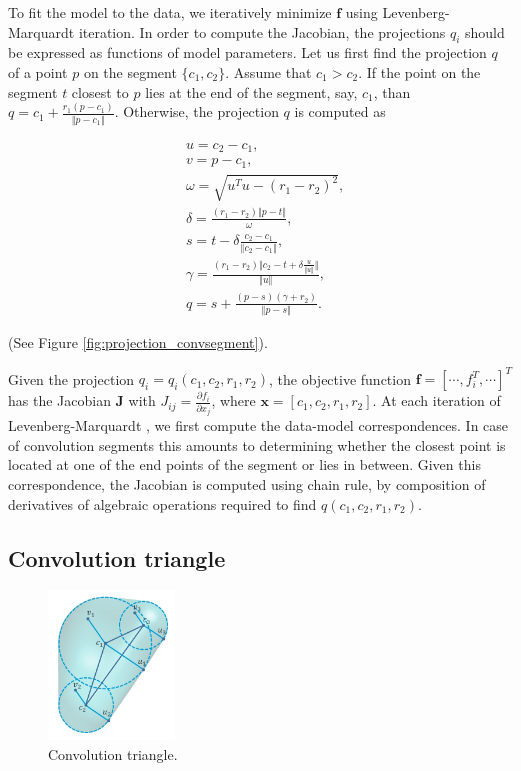 To fit the model to the data, we iteratively minimize $\textbf{f}$ using Levenberg-Marquardt iteration. In order to compute the Jacobian, the projections $q_i$ should be expressed as functions of model parameters. Let us first find the projection $q$ of a point $p$ on the segment $\{c_1, c_2\}$. Assume that $c_1 > c_2$. If the point on the segment $t$ closest to $p$ lies at the end of the segment, say, $c_1$, than $q = c_1 + \frac{r_1  (p - c_1)}{\Vert p - c_1 \Vert}$. 
Otherwise, the projection $q$ is computed as 

\begin{align*}
& u = c_2 - c_1, \\
& v = p - c_1, \\
& \omega = \sqrt{u^T u - (r_1 - r_2)^2}, \\
&  \delta =  \frac{(r_1 - r_2) \Vert p - t \Vert}{\omega}, \\
&   s = t - \delta  \frac{c_2 - c_1} {\Vert c_2 - c_1 \Vert}, \\
&  \gamma = \frac{(r_1 - r_2)   {\Vert c_2 - t + \delta  \frac{u} {\Vert u \Vert}} \Vert} {\Vert u \Vert}, \\
&   q = s +\frac{ (p - s) (\gamma + r_2) }{ \Vert p - s \Vert } .
\end{align*}

(See Figure \ref{fig:projection_convsegment}).

Given the projection $q_i = q_i(c_1, c_2, r_1, r_2)$, the objective function $\textbf{f} = [\cdots, f_i^T, \cdots]^T$  has the Jacobian $\textbf{J}$ with $J_{ij} = \frac{\partial{f_i}}{\partial{x_j}}$, where $\textbf{x} = [c_1, c_2, r_1, r_2]$.  At each iteration of Levenberg-Marquardt , we first compute the data-model correspondences. In case of convolution segments this amounts to determining whether the closest point is located at one of the end points of the segment or lies in between. Given this correspondence, the Jacobian is computed using chain rule, by composition of derivatives of algebraic operations required to find $q(c_1, c_2, r_1, r_2)$.




\subsection{Convolution triangle}


\begin{figure}[h!] 
	\centering
	\hspace{-2em}
	\includegraphics[width=0.3\textwidth]{fig/old/convtriangle.png}
	\caption{Convolution triangle.}
	\label{fig:convtriangle}
\end{figure}

